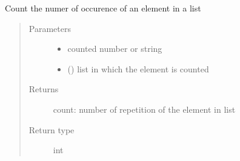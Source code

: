 \documentclass[letterpaper,10pt,english]{sphinxmanual}
\begin{document}
\begin{fulllineitems}
\label{\detokenize{ExperimentsPlannification:modules.count_occur}}
\sphinxAtStartPar
Count the numer of occurence of an element in a list
\begin{quote}\begin{description}
\item[{Parameters}] \leavevmode\begin{itemize}
\item {} 
\sphinxAtStartPar
{} \textendash{} counted number or string

\item {} 
\sphinxAtStartPar
{} () \textendash{} list in which the element is counted

\end{itemize}

\item[{Returns}] \leavevmode
\sphinxAtStartPar
count: number of repetition of the element in list

\item[{Return type}] \leavevmode
\sphinxAtStartPar
int

\end{description}\end{quote}

\end{fulllineitems}

\label{\detokenize{ExperimentsPlannification:module-modules}}
\end{document}
